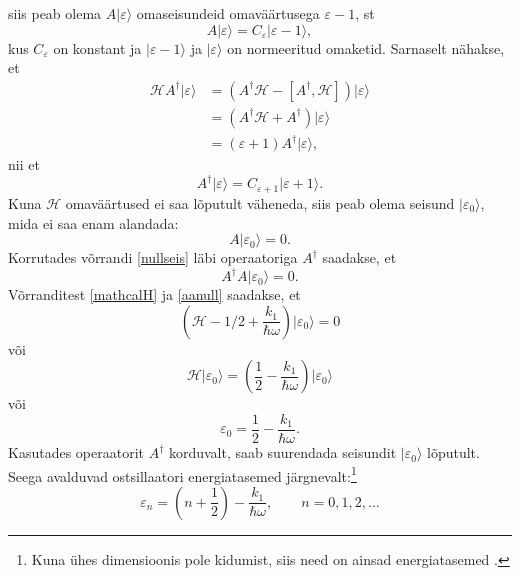 \documentclass{trkut}%
\renewcommand\ket[1]{{|{#1}\rangle}}
\begin{document}
siis peab olema $A\ket{\varepsilon}$ omaseisundeid omaväärtusega $\varepsilon - 1$, st
\begin{equation}
    A\ket{\varepsilon}=C_\varepsilon \ket{\varepsilon -1},
    \label{cepsilon}
\end{equation}
kus $C_\varepsilon$ on konstant ja $\ket{\varepsilon -1}$ ja $\ket{\varepsilon}$ on normeeritud omaketid.
Sarnaselt nähakse, et
\begin{align}
    \mathcal{H}A^\dagger\ket{\varepsilon}&=\left(A^\dagger\mathcal{H}-[A^\dagger, \mathcal{H}]\right)\ket{\varepsilon} \nonumber \\
    &=(A^\dagger\mathcal{H}+A^\dagger)\ket{\varepsilon} \nonumber \\
    &=(\varepsilon + 1)A^\dagger\ket{\varepsilon},
\end{align}
nii et
\begin{equation}
    A^\dagger\ket{\varepsilon}=C_{\varepsilon+1} \ket{\varepsilon+1}.
    \label{cepsilon1}
\end{equation}
Kuna $\mathcal{H}$ omaväärtused ei saa lõputult väheneda, siis peab olema seisund $\ket{\varepsilon_0}$, mida ei saa enam alandada:
\begin{equation}
    A\ket{\varepsilon_0}=0.
    \label{nullseis}
\end{equation}
Korrutades võrrandi \eqref{nullseis} läbi operaatoriga $A^\dagger$ saadakse, et
\begin{equation}
    A^\dagger A\ket{\varepsilon_0}=0.
    \label{aanull}
\end{equation}
Võrranditest \eqref{mathcalH} ja \eqref{aanull} saadakse, et
\begin{equation}
    \left(\mathcal{H}-1/2 + \frac{k_1}{\hbar \omega} \right)\ket{\varepsilon_0}=0
\end{equation}
või
\begin{equation}
    \mathcal{H}\ket{\varepsilon_0}=\left(\frac{1}{2} - \frac{k_1}{\hbar \omega}\right) \ket{\varepsilon_0}
\end{equation}
või
\begin{equation}
    \varepsilon_0=\frac{1}{2} - \frac{k_1}{\hbar \omega}.
\end{equation}
Kasutades operaatorit $A^\dagger$ korduvalt, saab suurendada seisundit $\ket{\varepsilon_0}$ lõputult.
Seega avalduvad ostsillaatori energiatasemed järgnevalt:\footnote{Kuna ühes dimensioonis pole kidumist, siis need on ainsad energiatasemed \parencite[176-177]{shankar94}.}
\begin{equation}
    \varepsilon_n=\left(n+\frac{1}{2}\right)-\frac{k_1}{\hbar \omega}, \qquad n=0, 1, 2,\dots
\end{equation}
\end{document}
